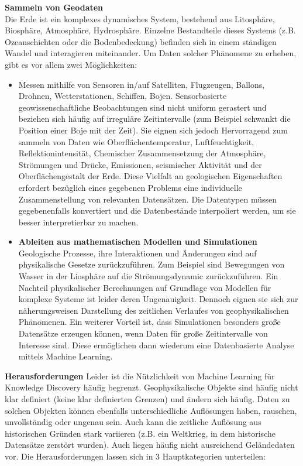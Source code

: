 \documentclass[11pt,fleqn]{book}
\begin{document}
\textbf{Sammeln von Geodaten}\\
Die Erde ist ein komplexes dynamisches System, bestehend aus Litosphäre, Biosphäre, Atmosphäre, Hydrosphäre. Einzelne Bestandteile dieses Systems (z.B. Ozeanschichten oder die Bodenbedeckung) befinden sich in einem ständigen Wandel und interagieren miteinander. Um Daten solcher Phänomene zu erheben, gibt es vor allem zwei Möglichkeiten:
\begin{itemize}
\item Messen mithilfe von Sensoren in/auf Satelliten, Flugzeugen, Ballons, Drohnen, Wetterstationen, Schiffen, Bojen.\newline
Sensorbasierte geowissenschaftliche Beobachtungen sind nicht uniform gerastert und beziehen sich häufig auf irreguläre Zeitintervalle (zum Beispiel schwankt die Position einer Boje mit der Zeit). Sie eignen sich jedoch Hervorragend zum sammeln von Daten wie Oberflächentemperatur, Luftfeuchtigkeit, Reflektionintensität, Chemischer Zusammensetzung der Atmosphäre, Strömungen und Drücke, Emissionen, seismischer Aktivität und der Oberflächengestalt der Erde. Diese Vielfalt an geologischen Eigenschaften erfordert bezüglich eines gegebenen Problems eine individuelle Zusammenstellung von relevanten Datensätzen. Die Datentypen müssen gegebenenfalls konvertiert und die Datenbestände interpoliert werden, um sie besser interpretierbar zu machen.

\item \textbf{Ableiten aus mathematischen Modellen und Simulationen}
Geologische Prozesse, ihre Interaktionen und Änderungen sind auf physikalische Gesetze zurückzuführen. Zum Beispiel sind Bewegungen von Wasser in der Liosphäre auf die Strömungsdynamic zurückzuführen. Ein Nachteil physikalischer Berechnungen auf Grundlage von Modellen für komplexe Systeme ist leider deren Ungenauigkeit. Dennoch eignen sie sich zur näherungsweisen Darstellung des zeitlichen Verlaufes von geophysikalischen Phänomenen. Ein weiterer Vorteil ist, dass Simulationen besonders große Datensätze erzeugen können, wenn Daten für große Zeitintervalle von Interesse sind. Diese ermöglichen dann wiederum eine Datenbasierte Analyse mittels Machine Learning.
\end{itemize}
\bigskip
\textbf{Herausforderungen}
Leider ist die Nützlichkeit von Machine Learning für Knowledge Discovery häufig begrenzt. Geophysikalische Objekte sind häufig nicht klar definiert (keine klar definierten Grenzen) und ändern sich häufig. Daten zu solchen Objekten können ebenfalls unterschiedliche Auflösungen haben, rauschen, unvollständig oder ungenau sein. Auch kann die zeitliche Auflösung aus historischen Gründen stark variieren (z.B. ein Weltkrieg, in dem historische Datensätze zerstört wurden). Auch liegen häufig nicht ausreichend Geländedaten vor. Die Herausforderungen lassen sich in 3 Hauptkategorien unterteilen:
\end{document}
